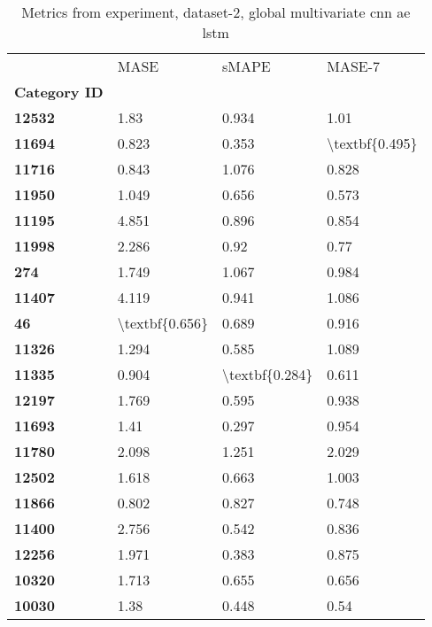 \begin{table}[h]
\centering
\caption{Metrics from experiment, dataset-2, global multivariate cnn ae lstm}
\label{table:global-multivariate-cnn-ae-lstm-dataset-2}
\begin{tabular}{llll}
\toprule
{} &            MASE &           sMAPE &          MASE-7 \\
\textbf{Category ID} &                 &                 &                 \\
\midrule
\textbf{12532      } &            1.83 &           0.934 &            1.01 \\
\textbf{11694      } &           0.823 &           0.353 &  \textbackslash textbf\{0.495\} \\
\textbf{11716      } &           0.843 &           1.076 &           0.828 \\
\textbf{11950      } &           1.049 &           0.656 &           0.573 \\
\textbf{11195      } &           4.851 &           0.896 &           0.854 \\
\textbf{11998      } &           2.286 &            0.92 &            0.77 \\
\textbf{274        } &           1.749 &           1.067 &           0.984 \\
\textbf{11407      } &           4.119 &           0.941 &           1.086 \\
\textbf{46         } &  \textbackslash textbf\{0.656\} &           0.689 &           0.916 \\
\textbf{11326      } &           1.294 &           0.585 &           1.089 \\
\textbf{11335      } &           0.904 &  \textbackslash textbf\{0.284\} &           0.611 \\
\textbf{12197      } &           1.769 &           0.595 &           0.938 \\
\textbf{11693      } &            1.41 &           0.297 &           0.954 \\
\textbf{11780      } &           2.098 &           1.251 &           2.029 \\
\textbf{12502      } &           1.618 &           0.663 &           1.003 \\
\textbf{11866      } &           0.802 &           0.827 &           0.748 \\
\textbf{11400      } &           2.756 &           0.542 &           0.836 \\
\textbf{12256      } &           1.971 &           0.383 &           0.875 \\
\textbf{10320      } &           1.713 &           0.655 &           0.656 \\
\textbf{10030      } &            1.38 &           0.448 &            0.54 \\
\bottomrule
\end{tabular}
\end{table}
